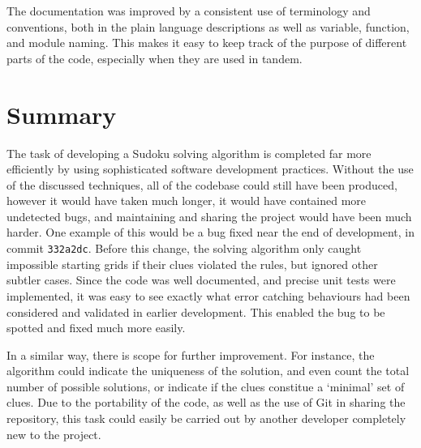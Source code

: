 \documentclass[12pt]{article}
\begin{document}
The documentation was improved by a consistent use of terminology and conventions, both in the plain language descriptions as well as variable, function, and module naming.
This makes it easy to keep track of the purpose of different parts of the code, especially when they are used in tandem.

\section{Summary}

The task of developing a Sudoku solving algorithm is completed far more efficiently by using sophisticated software development practices.
Without the use of the discussed techniques, all of the codebase could still have been produced, however it would have taken much longer, it would have contained more undetected bugs, and maintaining and sharing the project would have been much harder.
One example of this would be a bug fixed near the end of development, in commit \texttt{332a2dc}.
Before this change, the solving algorithm only caught impossible starting grids if their clues violated the rules, but ignored other subtler cases.
Since the code was well documented, and precise unit tests were implemented, it was easy to see exactly what error catching behaviours had been considered and validated in earlier development.
This enabled the bug to be spotted and fixed much more easily.

In a similar way, there is scope for further improvement. For instance, the algorithm could indicate the uniqueness of the solution, and even count the total number of possible solutions, or indicate if the clues constitue a `minimal' set of clues.
Due to the portability of the code, as well as the use of Git in sharing the repository, this task could easily be carried out by another developer completely new to the project.


\end{document}
